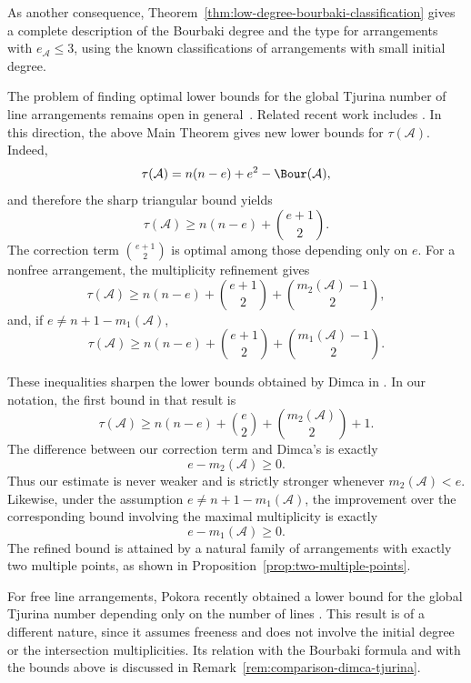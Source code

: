 \documentclass[11pt]{amsart}   %
\theoremstyle{definition}
\def\A{{\mathcal A}}
\begin{document}
As another consequence, Theorem~\ref{thm:low-degree-bourbaki-classification}
gives a complete description of the Bourbaki degree and the type for
arrangements with $e_\A\leq3$, using the known classifications of
arrangements with small initial degree.

The problem of finding optimal lower bounds for the global Tjurina
number of line arrangements remains open in general~\cite{Dimca-free-open-problems}. Related recent work includes
\cite{Dimca-remarks-freeness, Dimca-local-derivations,
Dimca-Kuhne-Pokora,Pokora-Tjurina-bounds}. In this direction, the above Main
Theorem gives new lower bounds for
$\tau(\A)$. Indeed,
\[
\tau(\A)=n(n-e)+e^2-\Bour(\A),
\]
and therefore the sharp triangular bound yields
\[
\tau(\A)\geq
n(n-e)+\binom{e+1}{2}.
\]
The correction term $\binom{e+1}{2}$ is optimal among those depending
only on $e$. For a nonfree arrangement, the multiplicity refinement
gives
\[
\tau(\A)\geq
n(n-e)+\binom{e+1}{2}
+\binom{m_2(\A)-1}{2},
\]
and, if $e\neq n+1-m_1(\A)$,
\[
\tau(\A)\geq
n(n-e)+\binom{e+1}{2}
+\binom{m_1(\A)-1}{2}.
\]

These inequalities sharpen the lower bounds obtained by Dimca in
\cite[Theorem~1.3]{Dimca-minimal-Tjurina}. In our notation, the first
bound in that result is
\[
\tau(\A)\geq
n(n-e)+\binom e2+\binom{m_2(\A)}2+1.
\]
The difference between our correction term and Dimca's is exactly
\[
e-m_2(\A)\geq0.
\]
Thus our estimate is never weaker and is strictly stronger whenever
$m_2(\A)<e$. Likewise, under the assumption
$e\neq n+1-m_1(\A)$, the improvement over the corresponding bound
involving the maximal multiplicity is exactly
\[
e-m_1(\A)\geq0.
\]
The refined bound is attained by a natural family of arrangements
with exactly two multiple points, as shown in
Proposition~\ref{prop:two-multiple-points}.

For free line arrangements, Pokora recently obtained a lower bound
for the global Tjurina number depending only on the number of lines
\cite[Corollary~4.2]{Pokora-Tjurina-bounds}. This result is of a
different nature, since it assumes freeness and does not involve the
initial degree or the intersection multiplicities. Its relation with
the Bourbaki formula and with the bounds above is discussed in
Remark~\ref{rem:comparison-dimca-tjurina}. 

\medskip
\end{document}

